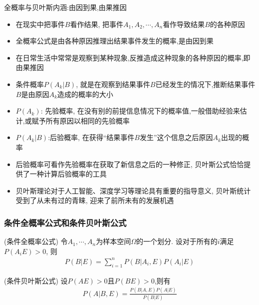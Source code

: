 \begin{frame}{全概率与贝叶斯内涵:由因到果,由果推因}
	\begin{itemize}[<+-|alert@+>]
		\item 在现实中把事件$B$看作结果, 把事件$A_1,A_2,\cdots, A_n$看作导致结果$B$的各种原因
		\item 全概率公式是由各种原因推理出结果事件发生的概率,是由因到果
		\item 在日常生活中常常是观察到某种现象,反推造成这种现象的各种原因的概率,即由果推因
		\item 条件概率$P(A_k|B)$, 就是在观察到结果事件$B$已经发生的情况下,推断结果事件$B$是由原因$A_k$造成的概率的大小
		\item $P(A_k)$: 先验概率, 在没有别的前提信息情况下的概率值,一般借助经验来估计,或赋予所有原因以相同的先验概率
		\item $P(A_k|B)$:后验概率, 在获得“结果事件$B$发生”这个信息之后原因$A_k$出现的概率
		\item 后验概率可看作先验概率在获取了新信息之后的一种修正, 贝叶斯公式恰恰提供了一种计算后验概率的工具

		\item 贝叶斯理论对于人工智能、深度学习等理论具有重要的指导意义, 贝叶斯统计受到了从未有过的青睐, 迎来了前所未有的发展机遇
	\end{itemize}
\end{frame}

\begin{frame}
  \frametitle{条件全概率公式和条件贝叶斯公式}
  \vspace{0.2cm}
    \begin{thm} ({\tc 条件全概率公式}) 令$A_1,\cdots,A_n$为样本空间$\Omega$的一个划分. 设对于所有的$i$满足$P(A_iE)>0$, 则
   \begin{eqnarray*}
    P(B| E)=\sum_{i=1}^{n}P(B| A_{i},E)P(A_{i}| E)
    \end{eqnarray*}
    \end{thm}
    \pause
  \vspace{0.3cm}
  \begin{thm} ({\tc 条件贝叶斯公式}) 设$P(AE)>0$且$P(BE)>0$,则有
   \begin{eqnarray*}
    P(A| B,E)=\frac{P(B| A,E)P(A| E)}{P(B| E)}
    \end{eqnarray*}
    \end{thm}

\end{frame}

